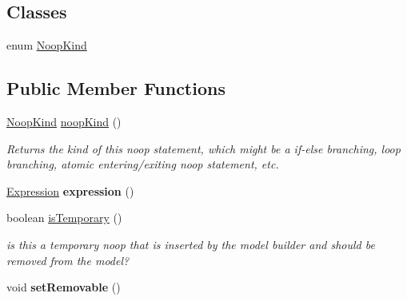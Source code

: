 \subsection*{Classes}
\begin{DoxyCompactItemize}
\item 
enum \hyperlink{enumedu_1_1udel_1_1cis_1_1vsl_1_1civl_1_1model_1_1IF_1_1statement_1_1NoopStatement_1_1NoopKind}{Noop\+Kind}
\end{DoxyCompactItemize}
\subsection*{Public Member Functions}
\begin{DoxyCompactItemize}
\item 
\hyperlink{enumedu_1_1udel_1_1cis_1_1vsl_1_1civl_1_1model_1_1IF_1_1statement_1_1NoopStatement_1_1NoopKind}{Noop\+Kind} \hyperlink{interfaceedu_1_1udel_1_1cis_1_1vsl_1_1civl_1_1model_1_1IF_1_1statement_1_1NoopStatement_aec89669b66851864b416c81d9c270801}{noop\+Kind} ()
\begin{DoxyCompactList}\small\item\em Returns the kind of this noop statement, which might be a if-\/else branching, loop branching, atomic entering/exiting noop statement, etc. \end{DoxyCompactList}\item 
\hypertarget{interfaceedu_1_1udel_1_1cis_1_1vsl_1_1civl_1_1model_1_1IF_1_1statement_1_1NoopStatement_ac0e1c42c24814d03f83c04f7c14b9759}{}\hyperlink{interfaceedu_1_1udel_1_1cis_1_1vsl_1_1civl_1_1model_1_1IF_1_1expression_1_1Expression}{Expression} {\bfseries expression} ()\label{interfaceedu_1_1udel_1_1cis_1_1vsl_1_1civl_1_1model_1_1IF_1_1statement_1_1NoopStatement_ac0e1c42c24814d03f83c04f7c14b9759}

\item 
boolean \hyperlink{interfaceedu_1_1udel_1_1cis_1_1vsl_1_1civl_1_1model_1_1IF_1_1statement_1_1NoopStatement_a68057b4e3168316fceacc4ac3212c6a7}{is\+Temporary} ()
\begin{DoxyCompactList}\small\item\em is this a temporary noop that is inserted by the model builder and should be removed from the model? \end{DoxyCompactList}\item 
\hypertarget{interfaceedu_1_1udel_1_1cis_1_1vsl_1_1civl_1_1model_1_1IF_1_1statement_1_1NoopStatement_af06428caa2711778779e0ea5bf1ce738}{}void {\bfseries set\+Removable} ()\label{interfaceedu_1_1udel_1_1cis_1_1vsl_1_1civl_1_1model_1_1IF_1_1statement_1_1NoopStatement_af06428caa2711778779e0ea5bf1ce738}


\end{DoxyCompactItemize}
